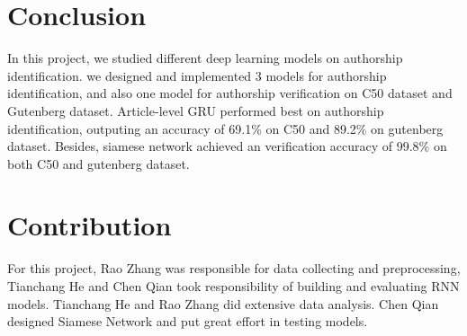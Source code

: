 \documentclass{article} %
\begin{document}
\section{Conclusion}

In this project, we studied different deep learning models on authorship identification. we designed and implemented 3 models for authorship identification, and also one model for authorship verification  on C50 dataset and Gutenberg dataset. Article-level GRU performed best on authorship identification, outputing an accuracy of 69.1\% on C50 and 89.2\% on gutenberg dataset. Besides, siamese network achieved an verification accuracy of 99.8\% on both C50 and gutenberg dataset.


\section{Contribution}

For this project, Rao Zhang was responsible for data collecting and preprocessing,  Tianchang He and Chen Qian took responsibility of building and evaluating RNN models. Tianchang He and Rao Zhang did extensive data analysis. Chen Qian designed Siamese Network and put great effort in testing models. 
\end{document}
